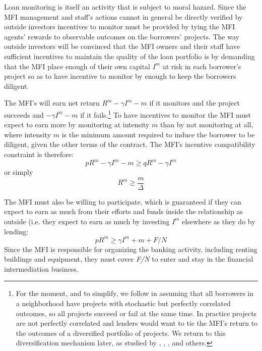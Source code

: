 \documentclass[letterpaper, 12pt]{article}
\begin{document}
Loan monitoring is itself an activity that is subject to moral hazard.
Since the MFI management and staff's actions cannot in general be
directly verified by outside investors incentives to monitor must be
provided by tying the MFI agents' rewards to observable outcomes on the
borrowers' projects. The way outside investors will be convinced that
the MFI owners and their staff have sufficient incentives to maintain
the quality of the loan portfolio is by demanding that the MFI place
enough of their own capital \(I^{m}\) at risk in each borrower's project
so as to have incentive to monitor by enough to keep the borrowers
diligent.

The MFI's will earn net return \(R^{m} - \gamma I^{m} - m\) if it
monitors and the project succeeds and \(- \gamma I^{m} - m\) if it
fails.\footnote{For the moment, and to simplify, we follow \citet{holmstrom1997} in assuming that all borrowers in a neighborhood have projects with stochastic but perfectly correlated outcomes, so all projects succeed or fail at the same time.  In practice projects are not perfectly correlated and lenders would want to tie the MFI's return to the outcomes of a diversified portfolio of projects. We return to this diversification mechanism later, as studied by \citet{diamond1984}, \citet{conning2006}, \citet[][158-163]{tirole2006}, \citet{ahlin2015a} and others.}
To have incentives to monitor the MFI must expect to earn more by
monitoring at intensity \(m\) than by not monitoring at all, where
intensity \(m\) is the minimum amount required to induce the borrower to
be diligent, given the other terms of the contract. The MFI's incentive
compatibility constraint is therefore:
\begin{equation*}
  pR^{m} - \gamma I^{m} - m \geq qR^{m} - \gamma I^{m} 
\end{equation*}
or simply
\begin{equation}
    R^m \geq \frac{m}{\Delta}
\end{equation}


The MFI must also be willing to participate, which is guaranteed if they
can expect to earn as much from their efforts and funds inside the
relationship as outside (i.e. they expect to earn as much by investing
\(I^{m}\) elsewhere as they do by lending:
\begin{equation}
  pR^{m} \geq \gamma I^{m} + m + F/N
\end{equation}
Since the MFI is responsible for organizing the banking activity, including renting buildings and equipment, they must cover \emph{F/N} to enter and stay in the financial intermediation business.
\end{document}

